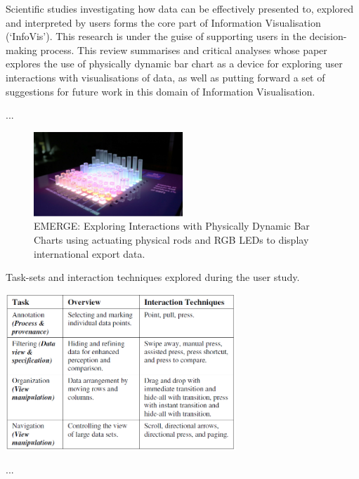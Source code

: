 \documentclass[11pt]{article}
\begin{document}

Scientific studies investigating how data can be effectively presented to, explored and interpreted by users forms the core part of Information Visualisation (`InfoVis'). This research is under the guise of supporting users in the decision-making process. This review summarises and critical analyses \citet{taher2015} whose paper explores the use of physically dynamic bar chart as a device for exploring user interactions with visualisations of data, as well as putting forward a set of suggestions for future work in this domain of Information Visualisation.

...

\begin{figure}[H]
\centering
\includegraphics[width=0.5\textwidth]{img/taher2015-emerge.png} 
\caption{EMERGE: Exploring Interactions with Physically Dynamic Bar Charts using actuating physical rods and RGB LEDs to display international export data.}\label{fig:taher2015-emerge}
\end{figure}

\begin{table}[H]
\centering
\caption{Task-sets and interaction techniques explored during the user study.}\label{tbl:taher2015-user-study}
\includegraphics[width=0.65\textwidth]{img/taher2015-user-study.png} 
\end{table}

...
\end{document}

